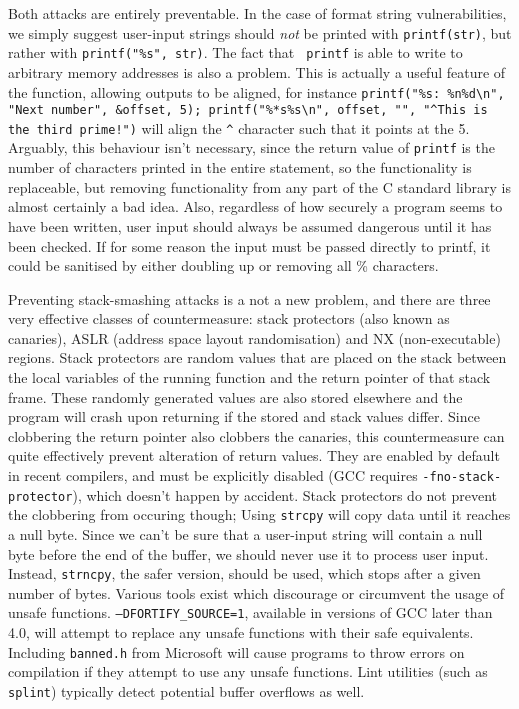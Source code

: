 Both attacks are entirely preventable. In the case of format string vulnerabilities, we simply suggest user-input
strings should \emph{not} be printed with {\tt printf(str)}, but rather with {\tt printf("\%s", str)}. The fact that {\tt
printf} is able to write to arbitrary memory addresses is also a problem. This is actually a useful feature of the
function, allowing outputs to be aligned, for instance {\tt printf("\%s: \%n\%d\textbackslash n", "Next number",
\&offset, 5); printf("\%*s\%s\textbackslash n", offset, "", "\textasciicircum This is the third prime!")} will align the
{\tt \textasciicircum} character such that it points at the 5. Arguably, this behaviour isn't necessary, since the
return value of {\tt printf} is the number of characters printed in the entire statement, so the functionality is
replaceable, but removing functionality from any part of the C standard library is almost certainly a bad idea. Also,
regardless of how securely a program seems to have been written, user input should always be assumed dangerous until it
has been checked. If for some reason the input must be passed directly to printf, it could be sanitised by either
doubling up or removing all \% characters.

Preventing stack-smashing attacks is a not a new problem, and there are three very effective classes of countermeasure:
stack protectors (also known as canaries), ASLR (address space layout randomisation) and NX (non-executable) regions.
Stack protectors are random values that are placed on the stack between the local variables of the running function and
the return pointer of that stack frame. These randomly generated values are also stored elsewhere and the program will
crash upon returning if the stored and stack values differ. Since clobbering the return pointer also clobbers the
canaries, this countermeasure can quite effectively prevent alteration of return values. They are enabled by default in
recent compilers, and must be explicitly disabled (GCC requires {\tt -fno-stack-protector}), which doesn't happen by
accident. Stack protectors do not prevent the clobbering from occuring though; Using {\tt strcpy} will copy data until
it reaches a null byte. Since we can't be sure that a user-input string will contain a null byte before the end of the
buffer, we should never use it to process user input. Instead, {\tt strncpy}, the safer version, should be used, which
stops after a given number of bytes. Various tools exist which discourage or circumvent the usage of unsafe functions.
{\tt --DFORTIFY\_SOURCE=1}\cite{fort_source}, available in versions of GCC later than 4.0, will attempt to replace any
unsafe functions with their safe equivalents. Including {\tt banned.h} from Microsoft\cite{banned} will cause programs
to throw errors on compilation if they attempt to use any unsafe functions. Lint utilities (such as {\tt splint})
typically detect potential buffer overflows as well.

